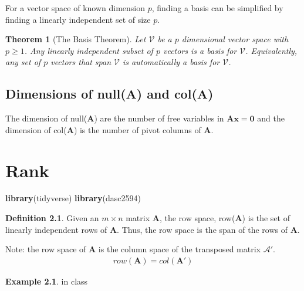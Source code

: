 \documentclass[
]{book}
\newenvironment{Shaded}{\begin{snugshade}}{\end{snugshade}}
\newcommand{\KeywordTok}[1]{\textcolor[rgb]{0.13,0.29,0.53}{\textbf{#1}}}
\newcommand{\NormalTok}[1]{#1}
\newtheorem{theorem}{Theorem}[chapter]
\theoremstyle{definition}
\newtheorem{definition}{Definition}[chapter]
\theoremstyle{definition}
\newtheorem{example}{Example}[chapter]
\theoremstyle{definition}
\theoremstyle{definition}
\theoremstyle{remark}
\begin{document}
For a vector space of known dimension \(p\), finding a basis can be simplified by finding a linearly independent set of size \(p\).

\begin{theorem}[The Basis Theorem]
Let \(\mathcal{V}\) be a \(p\) dimensional vector space with \(p \geq 1\). Any linearly independent subset of \(p\) vectors is a basis for \(\mathcal{V}\). Equivalently, any set of \(p\) vectors that span \({\mathcal{V}}\) is automatically a basis for \(\mathcal{V}\).
\end{theorem}

\hypertarget{dimensions-of-nullmathbfa-and-colmathbfa}{%
\section{\texorpdfstring{Dimensions of null(\(\mathbf{A}\)) and col(\(\mathbf{A}\))}{Dimensions of null(\textbackslash mathbf\{A\}) and col(\textbackslash mathbf\{A\})}}\label{dimensions-of-nullmathbfa-and-colmathbfa}}

The dimension of null(\(\mathbf{A}\)) are the number of free variables in \(\mathbf{A}\mathbf{x} = \mathbf{0}\) and the dimension of col(\(\mathbf{A}\)) is the number of pivot columns of \(\mathbf{A}\).

\hypertarget{rank-1}{%
\chapter{Rank}\label{rank-1}}

\begin{Shaded}
\begin{Highlighting}[]
\KeywordTok{library}\NormalTok{(tidyverse)}
\KeywordTok{library}\NormalTok{(dasc2594)}
\end{Highlighting}
\end{Shaded}

\begin{definition}
Given an \(m \times n\) matrix \(\mathbf{A}\), the row space, row(\(\mathbf{A}\)) is the set of linearly independent rows of \(\mathbf{A}\). Thus, the row space is the span of the rows of \(\mathbf{A}\).
\end{definition}

Note: the row space of \(\mathbf{A}\) is the column space of the transposed matrix \(\mathcal{A}'\).
\[
\begin{aligned}
row(\mathbf{A}) = col(\mathbf{A}')
\end{aligned}
\]

\begin{example}
in class
\end{example}
\end{document}
